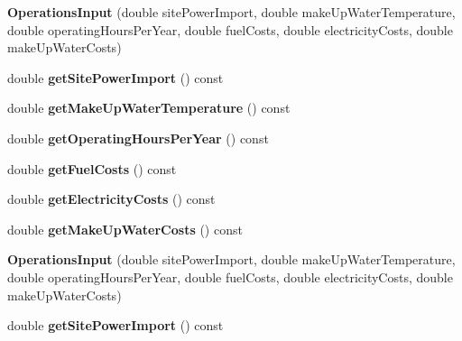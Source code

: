 \begin{DoxyCompactItemize}
\mbox{\label{class_operations_input_ad22e756e5da663c76dbf4f5e80125f7a}} 
{\bfseries Operations\+Input} (double site\+Power\+Import, double make\+Up\+Water\+Temperature, double operating\+Hours\+Per\+Year, double fuel\+Costs, double electricity\+Costs, double make\+Up\+Water\+Costs)
\item 
\mbox{\label{class_operations_input_a72b75b4504bbba6aace018f5e78f3939}} 
double {\bfseries get\+Site\+Power\+Import} () const
\item 
\mbox{\label{class_operations_input_a73ed7e6f975db188d5b9bae97b96d411}} 
double {\bfseries get\+Make\+Up\+Water\+Temperature} () const
\item 
\mbox{\label{class_operations_input_a31e46749b9d8cad72bd13ee647863b0f}} 
double {\bfseries get\+Operating\+Hours\+Per\+Year} () const
\item 
\mbox{\label{class_operations_input_a7d73c641f00eefc18c10cf3dd79299ef}} 
double {\bfseries get\+Fuel\+Costs} () const
\item 
\mbox{\label{class_operations_input_a9e52d266627b127cbc8ff4d00f5d379b}} 
double {\bfseries get\+Electricity\+Costs} () const
\item 
\mbox{\label{class_operations_input_a32694bb1719f4cb889c14ec61fac914f}} 
double {\bfseries get\+Make\+Up\+Water\+Costs} () const
\item 
\mbox{\label{class_operations_input_ad22e756e5da663c76dbf4f5e80125f7a}} 
{\bfseries Operations\+Input} (double site\+Power\+Import, double make\+Up\+Water\+Temperature, double operating\+Hours\+Per\+Year, double fuel\+Costs, double electricity\+Costs, double make\+Up\+Water\+Costs)
\item 
\mbox{\label{class_operations_input_a72b75b4504bbba6aace018f5e78f3939}} 
double {\bfseries get\+Site\+Power\+Import} () const
\item 
\mbox{\label{class_operations_input_a73ed7e6f975db188d5b9bae97b96d411}} 

\end{DoxyCompactItemize}
